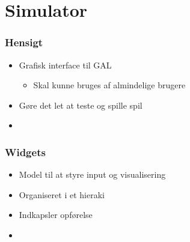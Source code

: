 \section{Simulator}

\begin{frame}
  \frametitle{Hensigt}

  \begin{itemize}
    \item Grafisk interface til GAL
	   \begin{itemize}
		  \item Skal kunne bruges af almindelige brugere
	   \end{itemize}
	 \item Gøre det let at teste og spille spil
	 \item 
  \end{itemize}
\end{frame}

\begin{frame}
  \frametitle{Widgets}

  \begin{itemize}
    \item Model til at styre input og visualisering
	 \item Organiseret i et hieraki
	 \item Indkapsler opførelse
	 \item 
  \end{itemize}
\end{frame}

